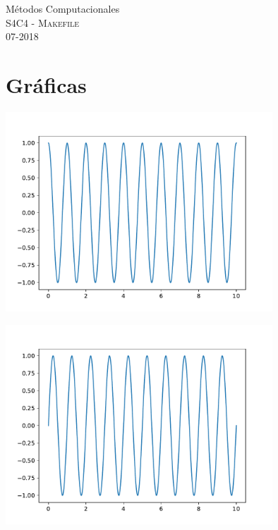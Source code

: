 \documentclass[11pt]{article}
\begin{document}
\begin{center}
{\Large Métodos Computacionales} \\
S4C4 - \textsc{Makefile}\\
07-2018\\
\end{center}


\noindent
\section{Gr\'aficas}
\begin{center}
\includegraphics[width=10cm]{plot.pdf} 
\begin{center}
\end{center}
\includegraphics[width=10cm]{plot1.pdf} 
\end{center}
\end{document}
